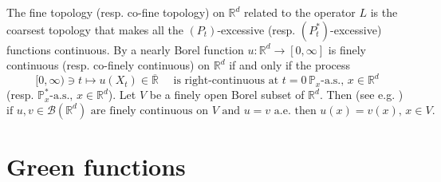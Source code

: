 \documentclass[11pt,a4paper,reqno]{amsart}
\theoremstyle{definition}
\numberwithin{equation}{section}
\begin{document}
The fine topology (resp. co-fine topology) on $\mathbb R^d$ related to the operator $L$ is the coarsest topology that makes all the $(P_t)$-excessive (resp. $(P^{*}_t)$-excessive) functions continuous. 
By \cite[Proposition 10.8]{Sharpe} a nearly Borel function $u:\mathbb R^d\to [0,\infty]$ is finely continuous (resp. co-finely continuous)
on  $\mathbb R^d$ if and only if   the process 
\begin{equation}
\label{eq.efq}
[0,\infty)\ni t\mapsto u(X_t)\in \overline {\mathbb R }\quad \text{ is right-continuous
at } t=0 \, \mathbb P_x\text{-a.s.},\, x\in\mathbb R^d
\end{equation}
(resp. $\mathbb P^*_x\text{-a.s.},\, x\in\mathbb R^d$).
Let $V$ be a finely open Borel subset of $\mathbb R^d$. Then (see e.g. \cite[Exercise 10.25]{Sharpe})
\begin{equation}
\label{eq.ppp1}
\text{if } u,v\in \mathscr B(\mathbb R^d) \text { are finely continuous on }V \text{ and }u=v \text{ a.e. then } u(x)=v(x),\, x\in V.
\end{equation}
\section{Green functions}
\end{document}
